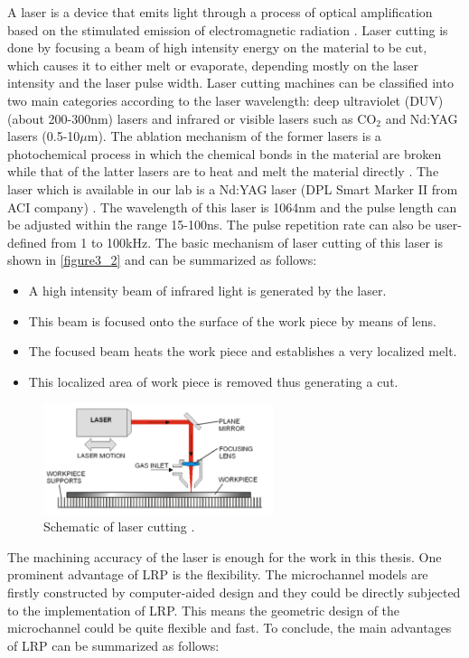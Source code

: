 A laser is a device that emits light through a process of optical amplification based on the stimulated emission of electromagnetic radiation \cite{ref_4}. Laser cutting is done by focusing a beam of high intensity energy on the material to be cut, which causes it to either melt or evaporate, depending mostly on the laser intensity and the laser pulse width. Laser cutting machines can be classified into two main categories according to the laser wavelength: deep ultraviolet (DUV) (about 200-300nm) lasers and infrared or visible lasers such as CO$_2$ and Nd:YAG lasers (0.5-10$\mu$m). The ablation mechanism of the former lasers is a photochemical process in which the chemical bonds in the material are broken while that of the latter lasers are to heat and melt the material directly \cite{lasermicromachining}. The laser which is available in our lab is a Nd:YAG laser (DPL Smart Marker II from ACI company) . The wavelength of this laser is 1064nm and the pulse length can be adjusted within the range 15-100ns. The pulse repetition rate can also be user-defined from 1 to 100kHz. The basic mechanism of laser cutting of this laser is shown in \autoref{figure3_2} and can be summarized as follows:

\begin{itemize}
	\item A high intensity beam of infrared light is generated by the laser.
	\item This beam is focused onto the surface of the work piece by means of lens.
	\item The focused beam heats the work piece and establishes a very localized melt.
	\item This localized area of work piece is removed thus generating a cut.
\end{itemize}

\begin{figure}[ht]%
\centering
\includegraphics[width=0.6\textwidth]{figures/designandfabrication/figure3_2}%
\caption{Schematic of laser cutting \cite{lasercut}.}%
\label{figure3_2}%
\end{figure}

The machining accuracy of the laser is enough for the work in this thesis. One prominent advantage of LRP is the flexibility. The microchannel models are firstly constructed by computer-aided design and they could be directly subjected to the implementation of LRP. This means the geometric design of the microchannel could be quite flexible and fast. To conclude, the main advantages of LRP can be summarized as follows:

